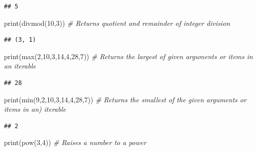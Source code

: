 \documentclass[]{book}
\newenvironment{Shaded}{\begin{snugshade}}{\end{snugshade}}
\newcommand{\DecValTok}[1]{\textcolor[rgb]{0.00,0.00,0.81}{#1}}
\newcommand{\CommentTok}[1]{\textcolor[rgb]{0.56,0.35,0.01}{\textit{#1}}}
\newcommand{\BuiltInTok}[1]{#1}
\newcommand{\NormalTok}[1]{#1}
\theoremstyle{definition}
\theoremstyle{definition}
\theoremstyle{definition}
\theoremstyle{remark}
\begin{document}
\begin{verbatim}
## 5
\end{verbatim}

\begin{Shaded}
\begin{Highlighting}[]
\BuiltInTok{print}\NormalTok{(}\BuiltInTok{divmod}\NormalTok{(}\DecValTok{10}\NormalTok{,}\DecValTok{3}\NormalTok{))             }\CommentTok{# Returns quotient and remainder of integer division}
\end{Highlighting}
\end{Shaded}

\begin{verbatim}
## (3, 1)
\end{verbatim}

\begin{Shaded}
\begin{Highlighting}[]
\BuiltInTok{print}\NormalTok{(}\BuiltInTok{max}\NormalTok{(}\DecValTok{2}\NormalTok{,}\DecValTok{10}\NormalTok{,}\DecValTok{3}\NormalTok{,}\DecValTok{14}\NormalTok{,}\DecValTok{4}\NormalTok{,}\DecValTok{28}\NormalTok{,}\DecValTok{7}\NormalTok{))    }\CommentTok{# Returns the largest of given arguments or items in an iterable}
\end{Highlighting}
\end{Shaded}

\begin{verbatim}
## 28
\end{verbatim}

\begin{Shaded}
\begin{Highlighting}[]
\BuiltInTok{print}\NormalTok{(}\BuiltInTok{min}\NormalTok{(}\DecValTok{9}\NormalTok{,}\DecValTok{2}\NormalTok{,}\DecValTok{10}\NormalTok{,}\DecValTok{3}\NormalTok{,}\DecValTok{14}\NormalTok{,}\DecValTok{4}\NormalTok{,}\DecValTok{28}\NormalTok{,}\DecValTok{7}\NormalTok{))  }\CommentTok{# Returns the smallest of the given arguments or items in an) iterable}
\end{Highlighting}
\end{Shaded}

\begin{verbatim}
## 2
\end{verbatim}

\begin{Shaded}
\begin{Highlighting}[]
\BuiltInTok{print}\NormalTok{(}\BuiltInTok{pow}\NormalTok{(}\DecValTok{3}\NormalTok{,}\DecValTok{4}\NormalTok{))                   }\CommentTok{# Raises a number to a power}
\end{Highlighting}
\end{Shaded}
\end{document}
